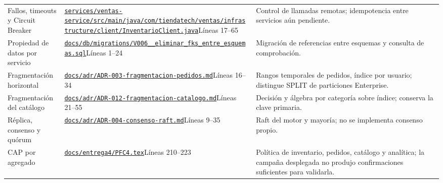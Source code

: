 {\begin{longtable}{>{\raggedright\arraybackslash}p{2.5cm}>{\raggedright\arraybackslash}p{6.7cm}>{\raggedright\arraybackslash}p{5.2cm}}
Fallos, timeouts y Circuit Breaker & \href{https://github.com/JoseLozanoMorales/TiendaTech/blob/d7a00ccf6d8ac5def08ff52f7d2880f869667b0b/services/ventas-service/src/main/java/com/tiendatech/ventas/infrastructure/client/InventarioClient.java\#L17-L65}{\nolinkurl{services/ventas-service/src/main/java/com/tiendatech/ventas/infrastructure/client/InventarioClient.java}}\newline Líneas 17--65 & Control de llamadas remotas; idempotencia entre servicios aún pendiente.\\
Propiedad de datos por servicio & \href{https://github.com/JoseLozanoMorales/TiendaTech/blob/d7a00ccf6d8ac5def08ff52f7d2880f869667b0b/docs/db/migrations/V006__eliminar_fks_entre_esquemas.sql\#L1-L24}{\nolinkurl{docs/db/migrations/V006__eliminar_fks_entre_esquemas.sql}}\newline Líneas 1--24 & Migración de referencias entre esquemas y consulta de comprobación.\\
Fragmentación horizontal & \href{https://github.com/JoseLozanoMorales/TiendaTech/blob/d7a00ccf6d8ac5def08ff52f7d2880f869667b0b/docs/adr/ADR-003-fragmentacion-pedidos.md\#L16-L34}{\nolinkurl{docs/adr/ADR-003-fragmentacion-pedidos.md}}\newline Líneas 16--34 & Rangos temporales de pedidos, índice por usuario; distingue SPLIT de particiones Enterprise.\\
Fragmentación del catálogo & \href{https://github.com/JoseLozanoMorales/TiendaTech/blob/d7a00ccf6d8ac5def08ff52f7d2880f869667b0b/docs/adr/ADR-012-fragmentacion-catalogo.md\#L21-L55}{\nolinkurl{docs/adr/ADR-012-fragmentacion-catalogo.md}}\newline Líneas 21--55 & Decisión y álgebra por categoría sobre índice; conserva la clave primaria.\\
Réplica, consenso y quórum & \href{https://github.com/JoseLozanoMorales/TiendaTech/blob/d7a00ccf6d8ac5def08ff52f7d2880f869667b0b/docs/adr/ADR-004-consenso-raft.md\#L9-L35}{\nolinkurl{docs/adr/ADR-004-consenso-raft.md}}\newline Líneas 9--35 & Raft del motor y mayoría; no se implementa consenso propio.\\
CAP por agregado & \href{https://github.com/JoseLozanoMorales/TiendaTech/blob/d7a00ccf6d8ac5def08ff52f7d2880f869667b0b/docs/entrega4/PFC4.tex\#L210-L223}{\nolinkurl{docs/entrega4/PFC4.tex}}\newline Líneas 210--223 & Política de inventario, pedidos, catálogo y analítica; la campaña desplegada no produjo confirmaciones suficientes para validarla.\\

\end{longtable}}
